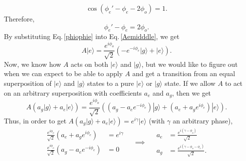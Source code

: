 \begin{equation}
\cos\left(\phi_e'-\phi_e-2\phi_o\right) = 1.
\end{equation}
Therefore, 
\begin{equation}
\phi_e'-\phi_e = 2\phi_o.\label{phiophie}
\end{equation}
By substituting Eq.\,\eqref{phiophie} into Eq.\,\eqref{Aemidddle}, we get
\begin{equation}
A|e\rangle = \frac{e^{i\phi_o}}{\sqrt{2}}\left(-e^{-i\phi_e}|g\rangle + |e\rangle \right).
\end{equation}
Now, we know how $A$ acts on both $|e\rangle$ and $|g\rangle$, but we would like to figure out when we can expect to be able to apply $A$ and get a transition from an equal superposition of $|e\rangle$ and $|g\rangle$ states to a pure $|e\rangle$ or $|g\rangle$ state. If we allow $A$ to act on an arbitrary superposition with coefficients $a_e$ and $a_g$, then we get 
\begin{equation}
A\left(a_g|g\rangle+a_e|e\rangle\right)= 
\frac{e^{i\phi_o}}{\sqrt{2}}
\left(
(a_g-a_e e^{-i\phi_e})|g\rangle +
(a_e+a_g e^{i\phi_e})|e\rangle 
\right).
\end{equation}
Thus, in order to get $A\left(a_g|g\rangle+a_e|e\rangle\right)=e^{i\gamma}|e\rangle$ (with $\gamma$ an arbitrary phase), 
\begin{equation}
\begin{aligned}
\frac{e^{i\phi_o}}{\sqrt{2}}\left(a_e+a_ge^{i\phi_e}\right) &= e^{i\gamma} \\
\frac{e^{i\phi_o}}{\sqrt{2}}\left(a_g-a_e e^{-i\phi_e}\right) &= 0 
\end{aligned}
\quad\implies\quad
\begin{aligned}
a_e&=\frac{e^{i(\gamma-\phi_o)}}{\sqrt{2}}\\
a_g&=\frac{e^{i(\gamma-\phi_o-\phi_e)}}{\sqrt{2}}.
\end{aligned}
\end{equation}
